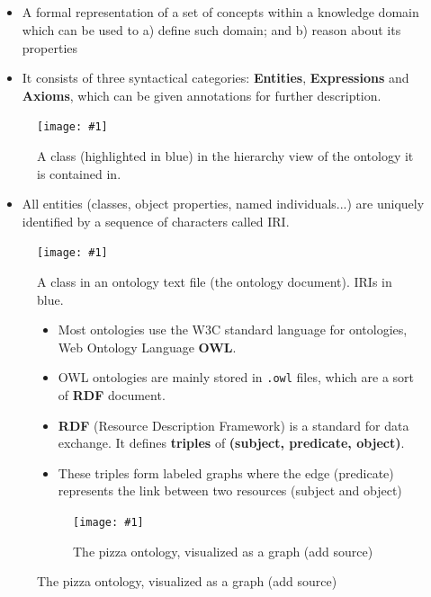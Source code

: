 \documentclass[english, xcolor=dvipsnames, aspectratio=169]{beamer}
\newcommand{\includefigurelarger}[2]
{
    \begin{figure}[h]
    \caption{#2}
    \centering
    \texttt{[image: \#1]}
    \end{figure}
}
\newcommand{\includefiguresmaller}[2]
{
    \begin{figure}[h]
    \caption{#2}
    \centering
    \texttt{[image: \#1]}
    \end{figure}
}
\newcommand{\subsectiontitle}{}
\begin{document}
\subsection{\subsectiontitle}
\begin{frame}{\subsectiontitle}
 			\begin{itemize}
\item A formal representation of a set of concepts within a knowledge domain which can be used to a) define such domain; and b) reason about its properties \citet{source}  
\item It consists of three syntactical categories: \textbf{Entities}, \textbf{Expressions} and \textbf{Axioms}, which can be given annotations for further description.
    		\end{itemize}

                \includefiguresmaller{classhierarchy.png}{A class (highlighted in blue) in the hierarchy view of the ontology it is contained in.}

\end{frame}




% 


\begin{frame}{\subsectiontitle}
\begin{itemize}
\item All entities (classes, object properties, named individuals...) are uniquely identified by a sequence of characters called IRI.

\end{itemize}

 \includefigurelarger{class.pdf}{A class in an ontology text file (the ontology document). IRIs in blue.}
\end{frame}

%

\begin{frame}{\subsectiontitle}
    \begin{figure}
        \begin{minipage}[b]{0.55\linewidth}
 			\begin{itemize}
\item Most ontologies use the W3C standard language for ontologies, Web Ontology Language \textbf{OWL}.
\item OWL ontologies are mainly stored in \texttt{.owl} files, which are a sort of \textbf{RDF} document.
\item \textbf{RDF} (Resource Description Framework) is a standard for data exchange. It defines \textbf{triples} of \textbf{(subject, predicate, object)}.
\item These triples form labeled graphs where the edge (predicate) represents the link between two resources (subject and object)
    		\end{itemize}
        \end{minipage}
    \hfill
     \begin{minipage}[b]{0.4\linewidth}
            \centering
            \includefigurelarger{pizzaontology.png}{The pizza ontology, visualized as a graph (add source)}
        \end{minipage}
    \end{figure}
\end{frame}
\end{document}
